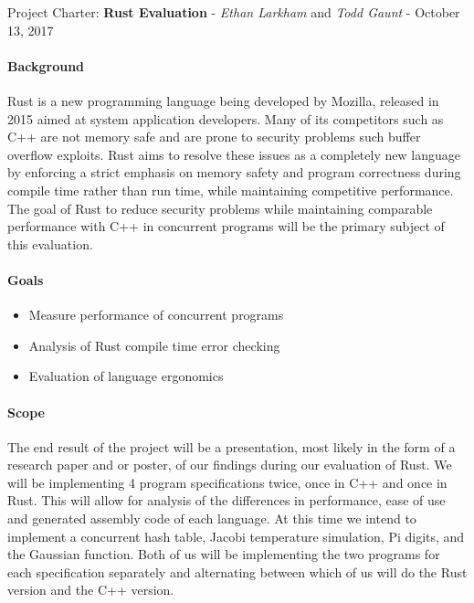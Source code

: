 \documentclass[10pt,a4paper]{report}
\begin{document}
\begin{center}
	{\Large Project Charter: {\bfseries Rust Evaluation}}
	- {\large{\itshape Ethan Larkham} and {\itshape Todd Gaunt}}
	- {\large October 13, 2017}
\end{center}
\vspace{0.5em}
\paragraph{Background}
Rust is a new programming language being developed by Mozilla, released in 2015
aimed at system application developers. Many of its competitors such as C++ are
not memory safe and are prone to security problems such buffer overflow
exploits. Rust aims to resolve these issues as a completely new language by
enforcing a strict emphasis on memory safety and program correctness during
compile time rather than run time, while maintaining competitive performance. 
The goal of Rust to reduce security problems while maintaining comparable
performance with C++ in concurrent programs will be the primary subject of this
evaluation.
\paragraph{Goals}
\begin{flushleft}
	\begin{itemize}
		\item Measure performance of concurrent programs
		\item Analysis of Rust compile time error checking
		\item Evaluation of language ergonomics
	\end{itemize}
\end{flushleft}
\paragraph{Scope}
The end result of the project will be a presentation, most likely in the form
of a research paper and or poster, of our findings during our evaluation of
Rust.  We will be implementing 4 program specifications twice, once in C++ and
once in Rust. This will allow for analysis of the differences in performance,
ease of use and generated assembly code of each language. At this time we
intend to implement a concurrent hash table, Jacobi temperature simulation,  Pi
digits, and the Gaussian function. Both of us will be implementing the two
programs for each specification separately and alternating between which of us
will do the Rust version and the C++ version. 
\end{document}
